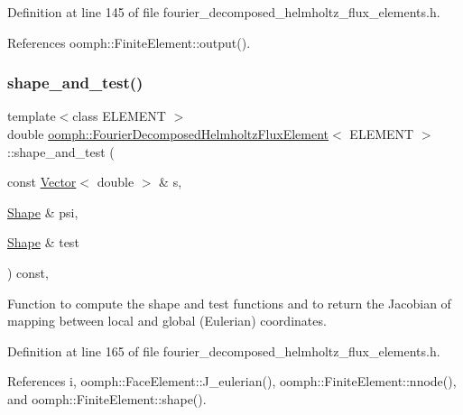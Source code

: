 Definition at line 145 of file fourier\+\_\+decomposed\+\_\+helmholtz\+\_\+flux\+\_\+elements.\+h.



References oomph\+::\+Finite\+Element\+::output().

\mbox{\label{classoomph_1_1FourierDecomposedHelmholtzFluxElement_ac991bbf6a39e26792e123505779faa9c}} 
\subsubsection{\texorpdfstring{shape\+\_\+and\+\_\+test()}{shape\_and\_test()}}
{\footnotesize\ttfamily template$<$class E\+L\+E\+M\+E\+NT $>$ \\
double \hyperlink{classoomph_1_1FourierDecomposedHelmholtzFluxElement}{oomph\+::\+Fourier\+Decomposed\+Helmholtz\+Flux\+Element}$<$ E\+L\+E\+M\+E\+NT $>$\+::shape\+\_\+and\+\_\+test (\begin{DoxyParamCaption}\item[{const \hyperlink{classoomph_1_1Vector}{Vector}$<$ double $>$ \&}]{s,  }\item[{\hyperlink{classoomph_1_1Shape}{Shape} \&}]{psi,  }\item[{\hyperlink{classoomph_1_1Shape}{Shape} \&}]{test }\end{DoxyParamCaption}) const\hspace{0.3cm}{\ttfamily [inline]}, {\ttfamily [protected]}}



Function to compute the shape and test functions and to return the Jacobian of mapping between local and global (Eulerian) coordinates. 



Definition at line 165 of file fourier\+\_\+decomposed\+\_\+helmholtz\+\_\+flux\+\_\+elements.\+h.



References i, oomph\+::\+Face\+Element\+::\+J\+\_\+eulerian(), oomph\+::\+Finite\+Element\+::nnode(), and oomph\+::\+Finite\+Element\+::shape().



